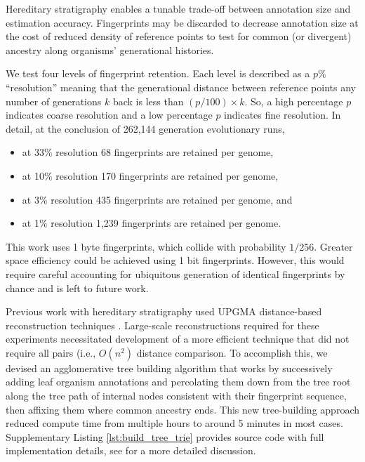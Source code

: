 Hereditary stratigraphy enables a tunable trade-off between annotation size and estimation accuracy.
Fingerprints may be discarded to decrease annotation size at the cost of reduced density of reference points to test for common (or divergent) ancestry along organisms' generational histories.

We test four levels of fingerprint retention.
Each level is described as a $p\%$ ``resolution'' meaning that the generational distance between reference points any number of generations $k$ back is less than $(p / 100) \times k$.
So, a high percentage $p$ indicates coarse resolution and a low percentage $p$ indicates fine resolution.
In detail, at the conclusion of 262,144 generation evolutionary runs,
\begin{itemize}
  \item at 33\% resolution 68 fingerprints are retained per genome,
  \item at 10\% resolution 170 fingerprints are retained per genome,
  \item at 3\% resolution 435 fingerprints are retained per genome, and
  \item at 1\% resolution 1,239 fingerprints are retained per genome.
\end{itemize}

This work uses 1 byte fingerprints, which collide with probability $1/256$.
Greater space efficiency could be achieved using 1 bit fingerprints.
However, this would require careful accounting for ubiquitous generation of identical fingerprints by chance and is left to future work.

Previous work with hereditary stratigraphy used UPGMA distance-based reconstruction techniques \citep{moreno2022hereditary}.
Large-scale reconstructions required for these experiments necessitated development of a more efficient technique that did not require all pairs (i.e., $O(n^2)$ distance comparison.
To accomplish this, we devised an agglomerative tree building algorithm that works by successively adding leaf organism annotations and percolating them down from the tree root along the tree path of internal nodes consistent with their fingerprint sequence, then affixing them where common ancestry ends.
This new tree-building approach reduced compute time from multiple hours to around 5 minutes in most cases.
Supplementary Listing \ref{lst:build_tree_trie} provides source code with full implementation details, see \citep{moreno2024analysis} for a more detailed discussion.



